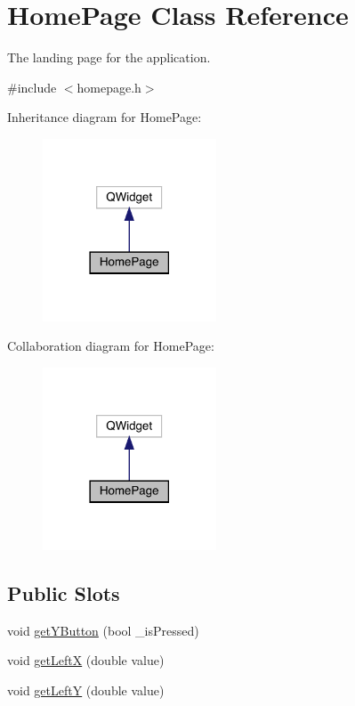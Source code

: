 \hypertarget{classHomePage}{}\section{Home\+Page Class Reference}
\label{classHomePage}


The landing page for the application.  




{\ttfamily \#include $<$homepage.\+h$>$}



Inheritance diagram for Home\+Page\+:\nopagebreak
\begin{figure}[H]
\begin{center}
\leavevmode
\includegraphics[width=146pt]{classHomePage__inherit__graph}
\end{center}
\end{figure}


Collaboration diagram for Home\+Page\+:\nopagebreak
\begin{figure}[H]
\begin{center}
\leavevmode
\includegraphics[width=146pt]{classHomePage__coll__graph}
\end{center}
\end{figure}
\subsection*{Public Slots}
\textbf{ }\par
\begin{DoxyCompactItemize}
\item 
void \mbox{\hyperlink{classHomePage_a8b38e0816ef5b863f13de62848a79d1e}{get\+Y\+Button}} (bool \+\_\+is\+Pressed)
\item 
void \mbox{\hyperlink{classHomePage_a63840fcd32af69c7d788ac93f6def734}{get\+LeftX}} (double value)
\item 
void \mbox{\hyperlink{classHomePage_a38c909855e6b1e1a0739642949aa4f9a}{get\+LeftY}} (double value)
\end{DoxyCompactItemize}

